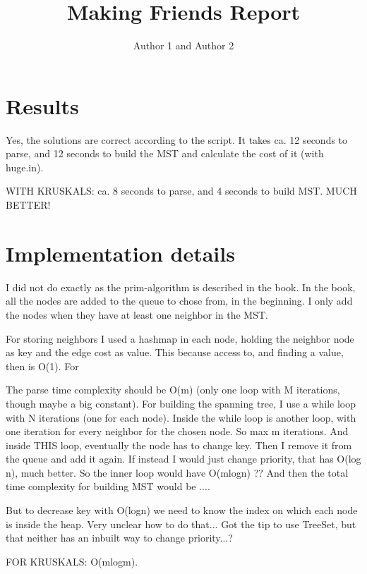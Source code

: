 \documentclass{article}
\title{Making Friends Report}
\author{Author 1 and Author 2}
\begin{document}
  \maketitle

  \section{Results}

  
  Yes, the solutions are correct according to the script.
  It takes ca. 12 seconds to parse, and 12 seconds to build the MST and calculate the cost of it (with huge.in).
  
  WITH KRUSKALS: ca. 8 seconds to parse, and 4 seconds to build MST. MUCH BETTER!

  \section{Implementation details}

  
  I did not do exactly as the prim-algorithm is described in the book.
  In the book, all the nodes are added to the queue to chose from, in the beginning. I only add the nodes when they have at least one neighbor in the MST.
  
  For storing neighbors I used a hashmap in each node, holding the neighbor node as key and the edge cost as value.
  This because access to, and finding a value, then is O(1).
  For 
  
  The parse time complexity should be O(m) (only one loop with M iterations, though maybe a big constant).
  For building the spanning tree, I use a while loop with N iterations (one for each node).
  Inside the while loop is another loop, with one iteration for every neighbor for the chosen node. So max m iterations.
  And inside THIS loop, eventually the node has to change key. Then I remove it from the queue and add it again.
  If instead I would just change priority, that has O(log n), much better.
  So the inner loop would have O(mlogn) ??
  And then the total time complexity for building MST would be ....
  
  But to decrease key with O(logn) we need to know the index on which each node is inside the heap.
  Very unclear how to do that...
  Got the tip to use TreeSet, but that neither has an inbuilt way to change priority...?
  
  
  FOR KRUSKALS: O(mlogm).
  
\end{document}
